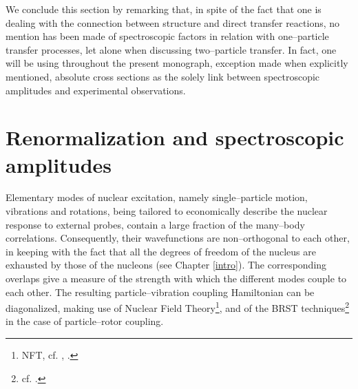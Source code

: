 We conclude this section by remarking that, in spite of the fact that one is dealing with the connection between structure and direct transfer reactions, no mention has been made of spectroscopic factors in relation with one--particle transfer processes, let alone when discussing two--particle transfer. In fact, one will be using throughout the present monograph, exception made when explicitly mentioned, absolute cross sections as the solely link between spectroscopic amplitudes and experimental observations.

\section{Renormalization and spectroscopic amplitudes}
 Elementary modes of nuclear excitation, namely single--particle motion, vibrations and rotations, being tailored to economically describe the nuclear response to external probes, contain a large fraction of the many--body correlations. Consequently, their wavefunctions are non--orthogonal to each other, in keeping with the fact that all the degrees of freedom of the nucleus are exhausted by those of the nucleons (see Chapter \ref{intro}). The corresponding overlaps give a measure of the strength with which the different modes couple to each other. The  resulting particle--vibration coupling Hamiltonian can be diagonalized,  making use of Nuclear Field Theory\footnote{NFT, cf. \cite{Bortignon:77}, \cite{Bortignon:78}.}, and of the  BRST techniques\footnote{cf. \cite{Bes:90}.} in the case of particle--rotor coupling. 
